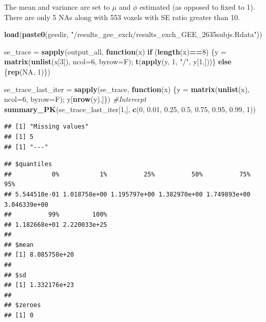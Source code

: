 \documentclass[]{article}
\newenvironment{Shaded}{\begin{snugshade}}{\end{snugshade}}
\newcommand{\CommentTok}[1]{\textcolor[rgb]{0.56,0.35,0.01}{\textit{#1}}}
\newcommand{\ControlFlowTok}[1]{\textcolor[rgb]{0.13,0.29,0.53}{\textbf{#1}}}
\newcommand{\DataTypeTok}[1]{\textcolor[rgb]{0.13,0.29,0.53}{#1}}
\newcommand{\DecValTok}[1]{\textcolor[rgb]{0.00,0.00,0.81}{#1}}
\newcommand{\FloatTok}[1]{\textcolor[rgb]{0.00,0.00,0.81}{#1}}
\newcommand{\KeywordTok}[1]{\textcolor[rgb]{0.13,0.29,0.53}{\textbf{#1}}}
\newcommand{\NormalTok}[1]{#1}
\newcommand{\OperatorTok}[1]{\textcolor[rgb]{0.81,0.36,0.00}{\textbf{#1}}}
\newcommand{\OtherTok}[1]{\textcolor[rgb]{0.56,0.35,0.01}{#1}}
\newcommand{\StringTok}[1]{\textcolor[rgb]{0.31,0.60,0.02}{#1}}
\begin{document}
The mean and variance are set to \(\mu\) and \(\phi\) estimated (as
opposed to fixed to 1). There are only 5 NAs along with 553 voxels with
SE ratio greater than 10.

\begin{Shaded}
\begin{Highlighting}[]
\KeywordTok{load}\NormalTok{(}\KeywordTok{paste0}\NormalTok{(geedir, }\StringTok{"/results_gee_exch/results_exch_GEE_2635subjs.Rdata"}\NormalTok{))}

\NormalTok{se_trace =}\StringTok{ }\KeywordTok{sapply}\NormalTok{(output_all, }\ControlFlowTok{function}\NormalTok{(x) }\ControlFlowTok{if}\NormalTok{ (}\KeywordTok{length}\NormalTok{(x)}\OperatorTok{==}\DecValTok{8}\NormalTok{) \{y =}\StringTok{ }\KeywordTok{matrix}\NormalTok{(}\KeywordTok{unlist}\NormalTok{(x[}\DecValTok{3}\NormalTok{]), }\DataTypeTok{ncol=}\DecValTok{6}\NormalTok{, }\DataTypeTok{byrow=}\NormalTok{F); }\KeywordTok{t}\NormalTok{(}\KeywordTok{apply}\NormalTok{(y, }\DecValTok{1}\NormalTok{, }\StringTok{"/"}\NormalTok{, y[}\DecValTok{1}\NormalTok{,]))\} }\ControlFlowTok{else}\NormalTok{ \{}\KeywordTok{rep}\NormalTok{(}\OtherTok{NA}\NormalTok{, }\DecValTok{1}\NormalTok{)\})}

\NormalTok{se_trace_last_iter =}\StringTok{ }\KeywordTok{sapply}\NormalTok{(se_trace, }\ControlFlowTok{function}\NormalTok{(x) \{y =}\StringTok{ }\KeywordTok{matrix}\NormalTok{(}\KeywordTok{unlist}\NormalTok{(x), }\DataTypeTok{ncol=}\DecValTok{6}\NormalTok{, }\DataTypeTok{byrow=}\NormalTok{F); y[}\KeywordTok{nrow}\NormalTok{(y),]\})}
\CommentTok{#Intercept}
\KeywordTok{summary_PK}\NormalTok{(se_trace_last_iter[}\DecValTok{1}\NormalTok{,], }\KeywordTok{c}\NormalTok{(}\DecValTok{0}\NormalTok{, }\FloatTok{0.01}\NormalTok{, }\FloatTok{0.25}\NormalTok{, }\FloatTok{0.5}\NormalTok{, }\FloatTok{0.75}\NormalTok{, }\FloatTok{0.95}\NormalTok{, }\FloatTok{0.99}\NormalTok{, }\DecValTok{1}\NormalTok{))}
\end{Highlighting}
\end{Shaded}

\begin{verbatim}
## [1] "Missing values"
## [1] 5
## [1] "---"
\end{verbatim}

\begin{verbatim}
## $quantiles
##           0%           1%          25%          50%          75%          95% 
## 5.544510e-01 1.018758e+00 1.195797e+00 1.382970e+00 1.749893e+00 3.046339e+00 
##          99%         100% 
## 1.182668e+01 2.220033e+25 
## 
## $mean
## [1] 8.085758e+20
## 
## $sd
## [1] 1.332176e+23
## 
## $zeroes
## [1] 0
\end{verbatim}
\end{document}
